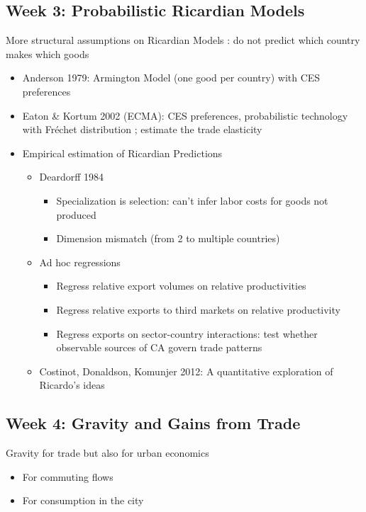 \documentclass[10pt, final]{article}
\begin{document}
\subsection{Week 3: Probabilistic Ricardian Models} %
\label{sub:week_3_probabilistic_ricardian_models}

More structural assumptions on Ricardian Models : do not predict which country makes which goods
\begin{itemize}
    \item Anderson 1979: Armington Model (one good per country) with CES preferences
    \item Eaton \& Kortum 2002 (ECMA): CES preferences, probabilistic technology with Fréchet distribution ; estimate the trade elasticity
    \item Empirical estimation of Ricardian Predictions
    \begin{itemize}
        \item Deardorff 1984
        \begin{itemize}
            \item Specialization is selection: can't infer labor costs for goods not produced
            \item Dimension mismatch (from 2 to multiple countries)
        \end{itemize}
        \item Ad hoc regressions
        \begin{itemize}
            \item Regress relative export volumes on relative productivities
            \item Regress relative exports to third markets on relative productivity 
            \item Regress exports on sector-country interactions: test whether observable sources of CA govern trade patterns
        \end{itemize}
        \item Costinot, Donaldson, Komunjer 2012: A quantitative exploration of Ricardo's ideas
    \end{itemize}
\end{itemize}


\subsection{Week 4: Gravity and Gains from Trade} %
\label{sub:week_4_gravity_and_gains_from_trade}

Gravity for trade but also for urban economics
\begin{itemize}
    \item For commuting flows
    \item For consumption in the city
\end{itemize}
\end{document}
